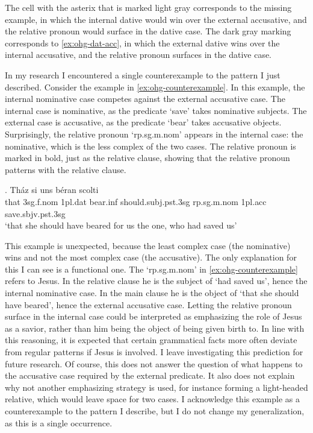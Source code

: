 The cell with the asterix that is marked light gray corresponds to the missing example, in which the internal dative would win over the external accusative, and the relative pronoun would surface in the dative case. The dark gray marking corresponds to \ref{ex:ohg-dat-acc}, in which the external dative wins over the internal accusative, and the relative pronoun surfaces in the dative case.

In my research I encountered a single counterexample to the pattern I just described.
Consider the example in \ref{ex:ohg-counterexample}. In this example, the internal nominative case competes against the external accusative case.
The internal case is nominative, as the predicate  `save' takes nominative subjects.
The external case is accusative, as the predicate  `bear' takes accusative objects.
Surprisingly, the relative pronoun  `\ac{rp}.\ac{sg}.\ac{m}.\ac{nom}' appears in the internal case: the nominative, which is the less complex of the two cases. The relative pronoun is marked in bold, just as the relative clause, showing that the relative pronoun patterns with the relative clause.

\exg. Tház si uns béran scolti   \\
 that 3\ac{sg}.\ac{f}.\ac{nom} 1\ac{pl}.\ac{dat} bear.\ac{inf}\scsub{[acc]} should.\ac{subj}.\ac{pst}.3\ac{sg} \ac{rp}.\ac{sg}.\ac{m}.\ac{nom} 1\ac{pl}.\ac{acc} save.\ac{sbjv}.\ac{pst}.3\ac{sg}\scsub{[nom]}\\
 `that she should have beared for us the one, who had saved us' \label{ex:ohg-counterexample}

This example is unexpected, because the least complex case (the nominative) wins and not the most complex case (the accusative).
The only explanation for this I can see is a functional one. The  `\ac{rp}.\ac{sg}.\ac{m}.\ac{nom}' in \ref{ex:ohg-counterexample} refers to Jesus. In the relative clause he is the subject of  `had saved us', hence the internal nominative case. In the main clause he is the object of  `that she should have beared', hence the external accusative case.
Letting the relative pronoun surface in the internal case could be interpreted as emphasizing the role of Jesus as a savior, rather than him being the object of being given birth to. In line with this reasoning, it is expected that certain grammatical facts more often deviate from regular patterns if Jesus is involved. I leave investigating this prediction for future research.
Of course, this does not answer the question of what happens to the accusative case required by the external predicate. It also does not explain why not another emphasizing strategy is used, for instance forming a light-headed relative, which would leave space for two cases.
I acknowledge this example as a counterexample to the pattern I describe, but I do not change my generalization, as this is a single occurrence.

